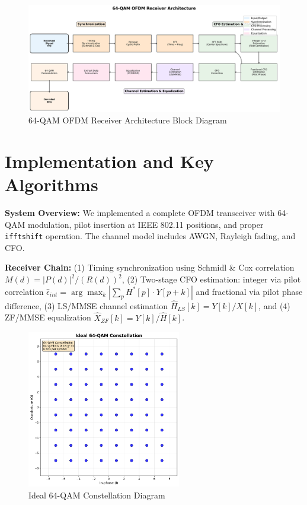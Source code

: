 \documentclass[11pt,a4paper]{article}
\begin{document}
\begin{figure}[H]
    \centering
    \includegraphics[width=\textwidth]{ofdm_receiver_block_diagram.png}
    \caption{64-QAM OFDM Receiver Architecture Block Diagram}
    \label{fig:block_diagram}
\end{figure}

\section{Implementation and Key Algorithms}

\textbf{System Overview:} We implemented a complete OFDM transceiver with 64-QAM modulation, pilot insertion at IEEE 802.11 positions, and proper \texttt{ifftshift} operation. The channel model includes AWGN, Rayleigh fading, and CFO.

\textbf{Receiver Chain:} (1) Timing synchronization using Schmidl \& Cox correlation $M(d) = |P(d)|^2/(R(d))^2$, (2) Two-stage CFO estimation: integer via pilot correlation $\hat{\epsilon}_{int} = \arg\max_k |\sum_p H^*[p] \cdot Y[p+k]|$ and fractional via pilot phase difference, (3) LS/MMSE channel estimation $\hat{H}_{LS}[k] = Y[k]/X[k]$, and (4) ZF/MMSE equalization $\hat{X}_{ZF}[k] = Y[k]/\hat{H}[k]$.

\begin{figure}[H]
    \centering
    \includegraphics[width=0.6\textwidth]{ideal_64qam_constellation.png}
    \caption{Ideal 64-QAM Constellation Diagram}
    \label{fig:ideal_constellation}
\end{figure}
\end{document}

